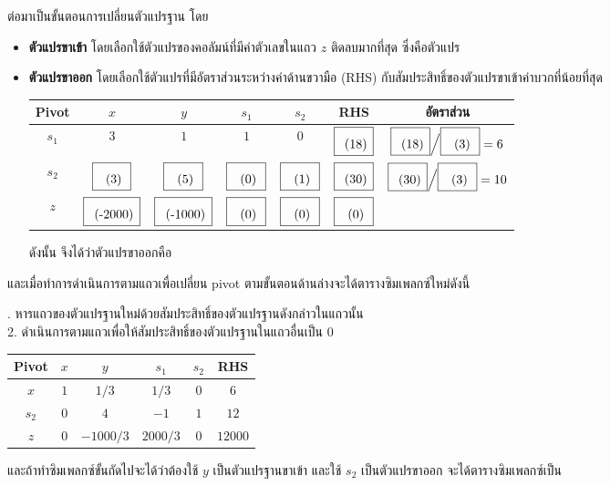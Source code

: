 \begin{solution}
ต่อมาเป็นขั้นตอนการเปลี่ยนตัวแปรฐาน โดย
\begin{itemize}
    \item \textbf{ตัวแปรขาเข้า} โดยเลือกใช้ตัวแปรของคอลัมน์ที่มีค่าตัวเลขในแถว $z$ ติดลบมากที่สุด ซึ่งคือตัวแปร \blank[$x$]{1cm}
    \item \textbf{ตัวแปรขาออก} โดยเลือกใช้ตัวแปรที่มีอัตราส่วนระหว่างค่าด้านขวามือ (RHS) กับสัมประสิทธิ์ของตัวแปรขาเข้าค่าบวกที่น้อยที่สุด
    \begin{center}
        \begin{tabular}{|c|cccc|c|c|}
            \hline
            \textbf{Pivot} & $x$ & $y$ &  $s_1$ & $s_2$ &  \textbf{RHS} & อัตราส่วน \\
            \hline
            $s_1$ & $3$ & $1$  & $1$ & $0$ & $\blank[18]{0.5cm}$ & $\blank[18]{0.5cm} {\Big /} \blank[3]{0.5cm} = 6$ \\
            $s_2$ & $\blank[3]{0.5cm}$ & $\blank[5]{0.5cm}$  & $\blank[0]{0.5cm}$ & $\blank[1]{0.5cm}$ & $\blank[30]{0.5cm}$ & $\blank[30]{0.5cm} {\Big /} \blank[3]{0.5cm} = 10$ \\
            \hline
            $z$   & $\blank[-2000]{1cm}$  & $\blank[-1000]{1cm}$ & $\blank[0]{0.5cm}$ & $\blank[0]{0.5cm}$& $\blank[0]{0.5cm}$  &  \\
            \hline
        \end{tabular}
    \end{center}
    ดังนั้น จึงได้ว่าตัวแปรขาออกคือ \blank[$s_1$]{1cm}
\end{itemize}
และเมื่อทำการดำเนินการตามแถวเพื่อเปลี่ยน pivot ตามขั้นตอนด้านล่างจะได้ตารางซิมเพลกซ์ใหม่ดังนี้
\begin{multicols}{2}
. หารแถวของตัวแปรฐานใหม่ด้วยสัมประสิทธิ์ของตัวแปรฐานดังกล่าวในแถวนั้น\\
2. ดำเนินการตามแถวเพื่อให้สัมประสิทธิ์ของตัวแปรฐานในแถวอื่นเป็น 0\\
\begin{tabular}{|c|cccc|c|}
    \hline
    \textbf{Pivot} & $x$ & $y$ &  $s_1$ & $s_2$ &  \textbf{RHS}  \\
    \hline
    $x$ & $1$ & $1/3$  & $1/3$ & $0$ & $6$ \\
    $s_2$ & $0$ & $4$  & $-1$ & $1$ & $12$ \\
    \hline
    $z$   & $0$ & $-1000/3$  & $2000/3$ & $0$ & $12000$ \\
    \hline
\end{tabular}
\end{multicols}

\begin{multicols}{2}
    และถ้าทำซิมเพลกซ์ขั้นถัดไปจะได้ว่าต้องใช้ $y$ เป็นตัวแปรฐานขาเข้า และใช้ $s_2$ เป็นตัวแปรขาออก จะได้ตารางซิมเพลกซ์เป็น


\end{multicols}
\end{solution}
